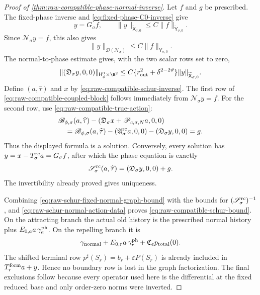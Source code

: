 \begin{proof}[Proof of
\cref{thm:raw-compatible-phase-normal-inverse}]
Let \(f\) and \(g\) be prescribed.  The fixed-phase inverse and
\cref{eq:fixed-phase-C0-inverse} give
\[
 y=G_\sigma f,\qquad
 \|y\|_{\widetilde{\mathsf X}_{\sigma,0}}
 \le C\|f\|_{\widetilde{\mathsf Y}_{\sigma,0}}.
\]
Since \(\mathscr N_\sigma y=f\), this also gives
\begin{equation}
 \|y\|_{\mathcal D(\mathscr N_\sigma)}
 \le C\|f\|_{\widetilde{\mathsf Y}_{\sigma,0}}.     \label{eq:raw-schur-fixed-normal-graph-bound}
\end{equation}
The normal-to-phase estimate gives, with the two scalar rows set to zero,
\begin{equation}
 \|(\mathfrak D_\sigma y,0,0)\|_{
       \mathsf H_\phi^0\times\R^2}
 \le C\{r_{\rm out}^2+\delta^{2-2\vartheta}\}
       \|y\|_{\widetilde{\mathsf X}_{\sigma,0}}.   \label{eq:raw-schur-normal-action-data}
\end{equation}
Define \((a,\widehat\tau)\) and \(x\) by
\cref{eq:raw-compatible-schur-inverse}.  The first row of
\cref{eq:raw-compatible-coupled-block} follows immediately from
\(\mathscr N_\sigma y=f\).  For the second row, use
\cref{eq:raw-compatible-true-action}:
\begin{align*}
 &\mathscr B_{\phi,\sigma}(a,\widehat\tau)
  -(\mathfrak D_\sigma x
       +\mathscr P_{c,\sigma,N}a,0,0)\\
 &\quad
 =\mathscr B_{\phi,\sigma}(a,\widehat\tau)
       -(\mathfrak A_\sigma^{\rm rc}a,0,0)
       -(\mathfrak D_\sigma y,0,0)
 =g.
\end{align*}
Thus the displayed formula is a solution.  Conversely, every solution has
\(y=x-T_\sigma^{\rm rc}a=G_\sigma f\), after which the phase equation is
exactly
\[
 \mathscr S_\sigma^{\rm rc}(a,\widehat\tau)
   =(\mathfrak D_\sigma y,0,0)+g.
\]
The invertibility already proved gives uniqueness.

Combining \cref{eq:raw-schur-fixed-normal-graph-bound} with the bounds for
\((\mathscr S_\sigma^{\rm rc})^{-1}\), and
\cref{eq:raw-schur-normal-action-data} proves
\cref{eq:raw-compatible-schur-bound}.  On the attracting branch the actual
old history is the prescribed normal history plus
\(E_{0,a}a\,\gamma_a^{\rm ph}\).  On the repelling branch it is
\[
 \gamma_{\rm normal}
 +E_{0,r}a\,\gamma_r^{\rm ph}
 +\mathfrak C_ep_{\rm total}(0).
\]
The shifted terminal row
\(p^\sharp(S_r)=b_r+\varepsilon P(S_r)\) is already included in
\(T_r^{\rm form}a+y\).  Hence no boundary row is lost in the graph
factorization.  The final exclusions follow because every operator used
here is the differential at the fixed reduced base and only order-zero
norms were inverted.
\end{proof}

